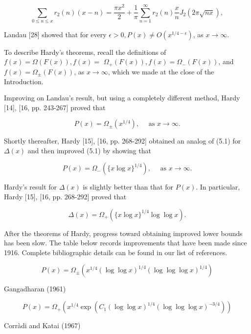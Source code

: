 \documentclass[10pt]{article}
\theoremstyle{plain}
\begin{document}
$$
\sum_{0 \leq n \leq x} r_{2}(n)(x-n)=\frac{\pi x^{2}}{2}+\frac{1}{\pi} \sum_{n=1}^{\infty} r_{2}(n)\frac{x}{n} J_{2}(2 \pi \sqrt{n x}),
$$

Landau [28] showed that for every $\epsilon>0, P(x) \neq O\left(x^{1 / 4-\epsilon}\right)$, as $x \to \infty$.

To describe Hardy's theorems, recall the definitions of $f(x)=\Omega(F(x)), f(x)=$ $\Omega_{+}(F(x)), f(x)=\Omega_{-}(F(x))$, and $f(x)=\Omega_{ \pm}(F(x))$, as $x \to \infty$, which we made at the close of the Introduction.

Improving on Landau's result, but using a completely different method, Hardy [14], [16, pp. 243-267] proved that


\begin{equation*}
P(x)=\Omega_{ \pm}\left(x^{1 / 4}\right), \quad \text { as } x \to \infty . \tag{5.1}
\end{equation*}


Shortly thereafter, Hardy [15], [16, pp. 268-292] obtained an analog of (5.1) for $\Delta(x)$ and then improved (5.1) by showing that


\begin{equation*}
P(x)=\Omega_{-}\left(\{x \log x\}^{1 / 4}\right), \quad \text { as } x \to \infty . \tag{5.2}
\end{equation*}


Hardy's result for $\Delta(x)$ is slightly better than that for $P(x)$. In particular, Hardy [15], [16, pp. 268-292] proved that


\begin{equation*}
\Delta(x)=\Omega_{+}\left(\{x \log x\}^{1 / 4} \log \log x\right) . \tag{5.3}
\end{equation*}


After the theorems of Hardy, progress toward obtaining improved lower bounds has been slow. The table below records improvements that have been made since 1916. Complete bibliographic details can be found in our list of references.

$$
P(x)=\Omega_{ \pm}\left(x^{1 / 4}(\log \log x)^{1 / 4}(\log \log \log x)^{1 / 4}\right)
$$

Gangadharan (1961)

$$
P(x)=\Omega_{+}\left(x^{1 / 4} \exp \left(C_{1}(\log \log x)^{1 / 4}(\log \log \log x)^{-3 / 4}\right)\right)
$$

Corràdi and Katai (1967)
\end{document}
